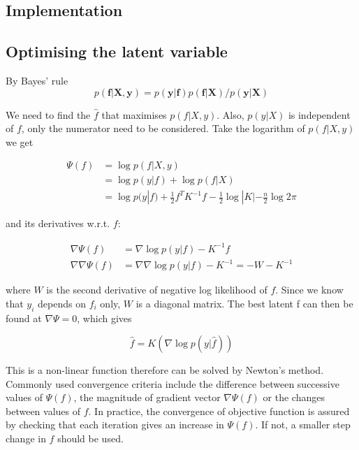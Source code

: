 \documentclass[11pt]{report}
\numberwithin{equation}{chapter}
\begin{document}
\begin{spacing}{2}
\section{Implementation}

\subsection{Optimising the latent variable}
By Bayes' rule
\[
p(\boldsymbol f|\boldsymbol X,\boldsymbol y) = {p(\boldsymbol y|\boldsymbol f)p(\boldsymbol f|\boldsymbol X)}/{p(\boldsymbol y|\boldsymbol X)} 
\]

We need to find the $\hat{f}$ that maximises $p(f|X,y)$. Also, $p(y|X)$ is independent of $f$, only the numerator need to be considered. Take the logarithm of $p(f|X,y)$ we get

\begin{equation}
\begin{split}
\Psi(f) & = \operatorname{log}p(f|X,y) \\
& = \operatorname{log}p(y|f) + \operatorname{log}p(f|X) \\
& = \operatorname{log}p(y|f) + \frac{1}{2}f^TK^{-1}f - \frac{1}{2}\operatorname{log}|K| - \frac{n}{2}\operatorname{log}2\pi
\end{split}
\end{equation}

and its derivatives w.r.t. $f$:

\begin{align}
\nabla\Psi(f) & = \nabla\operatorname{log}p(y|f) - K^{-1}f \\
\nabla\nabla\Psi(f) & = \nabla\nabla\operatorname{log}p(y|f) - K^{-1} = -W - K^{-1}
\end{align}

where $W$ is the second derivative of negative log likelihood of $f$. Since we know that $y_i$ depends on $f_i$ only, $W$ is a diagonal matrix. The best latent f can then be found at $\nabla\Psi = 0$, which gives 

\begin{equation}
\label{optimised_f}
\hat{f} = K(\nabla \operatorname{log}p(y|\hat{f}))
\end{equation}

This is a non-linear function therefore can be solved by Newton's method. Commonly used convergence criteria include the difference between successive values of $\Psi (f)$, the magnitude of gradient vector $\nabla\Psi (f)$ or the changes between values of $f$. In practice, the convergence of objective function is assured by checking that each iteration gives an increase in $\Psi (f)$. If not, a smaller step change in $f$ should be used. 


\end{spacing}
\end{document}
